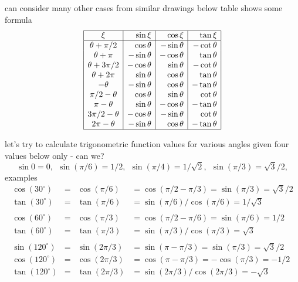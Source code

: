 \documentclass[17pt,landscape]{foils}
\begin{document}
\bit
\item
can consider many other cases from similar drawings
\vitem
below table shows some formula
\[
\begin{array}{|c|r|r|r|}
\hline
\xi & \sin\xi & \cos\xi & \tan\xi
\\
\hline
\theta +\pi/2& \cos\theta & -\sin\theta & -\cot\theta
\\
\theta + \pi & -\sin\theta & -\cos\theta & \tan\theta
\\
\theta + 3\pi/2 & -\cos\theta & \sin\theta & -\cot\theta
\\
\theta + 2\pi & \sin\theta & \cos\theta & \tan\theta
\\
-\theta & -\sin\theta & \cos\theta & -\tan\theta
\\
\pi/2-\theta & \cos\theta & \sin\theta & \cot\theta
\\
\pi-\theta & \sin\theta & -\cos\theta & -\tan\theta
\\
3\pi/2-\theta & -\cos\theta & -\sin\theta & \cot\theta
\\
2\pi-\theta & -\sin\theta & \cos\theta & -\tan\theta
\\
\hline
\end{array}
\]
\vitem
{}
\eit
{}
\bit
\item
let's try to calculate trigonometric function values for various angles
given four values below only - can we?
\[
\sin 0 = 0,
\ \
\sin(\pi/6) = 1/2,
\ \
\sin(\pi/4) = 1/\sqrt{2},
\ \
\sin(\pi/3) = \sqrt{3}/2,
\]
\vitem
examples
\[
\begin{array}{cccl}
\cos (30^\circ) &=& \cos (\pi/6) &= \cos(\pi/2 - \pi/3) = \sin(\pi/3) = \sqrt{3}/2
\\
\tan (30^\circ) &=& \tan (\pi/6) &= \sin(\pi/6) / \cos(\pi/6) = 1/ \sqrt{3}
\\
\\
\cos (60^\circ) &=& \cos (\pi/3) &= \cos(\pi/2 - \pi/6) = \sin(\pi/6) = {1}/2
\\
\tan (60^\circ) &=& \tan (\pi/3) &= \sin(\pi/3) / \cos(\pi/3) = \sqrt{3}
\\
\\
\sin (120^\circ) &=& \sin(2\pi/3) &= \sin(\pi - \pi/3) = \sin(\pi/3) = \sqrt{3}/2
\\
\cos (120^\circ) &=& \cos(2\pi/3) &= \cos(\pi - \pi/3) = -\cos(\pi/3) = -1/2
\\
\tan (120^\circ) &=& \tan (2\pi/3) &= \sin(2\pi/3) / \cos(2\pi/3) = -\sqrt{3}
\end{array}
\]
\end{document}
